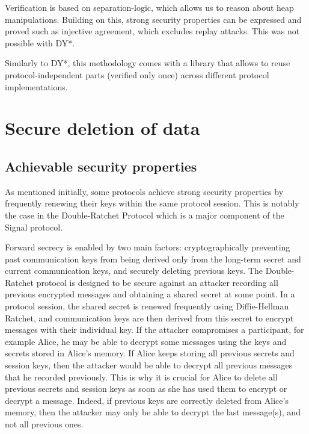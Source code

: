 \documentclass{article}
\begin{document}
Verification is based on separation-logic, which allows us to reason about heap manipulations. Building on this, strong security properties can be expressed and proved such as injective agreement, which excludes replay attacks. This was not possible with DY*.

Similarly to DY*, this methodology comes with a library that allows to reuse protocol-independent parts (verified only once) across different protocol implementations.

\section{Secure deletion of data}

\subsection{Achievable security properties}

As mentioned initially, some protocols achieve strong security properties by frequently renewing their keys within the same protocol session. This is notably the case in the Double-Ratchet Protocol \cite{perrin2016double} which is a major component of the Signal protocol.

Forward secrecy is enabled by two main factors: cryptographically preventing past communication keys from being derived only from the long-term secret and current communication keys, and securely deleting previous keys.
The Double-Ratchet protocol is designed to be secure against an attacker recording all previous encrypted messages and obtaining a shared secret at some point. In a protocol session, the shared secret is renewed frequently using Diffie-Hellman Ratchet, and communication keys are then derived from this secret to encrypt messages with their individual key. If the attacker compromises a participant, for example Alice, he may be able to decrypt some messages using the keys and secrets stored in Alice's memory. If Alice keeps storing all previous secrets and session keys, then the attacker would be able to decrypt all previous messages that he recorded previously. This is why it is crucial for Alice to delete all previous secrets and session keys as soon as she has used them to encrypt or decrypt a message.
Indeed, if previous keys are correctly deleted from Alice's memory, then the attacker may only be able to decrypt the last message(s), and not all previous ones.
\end{document}
